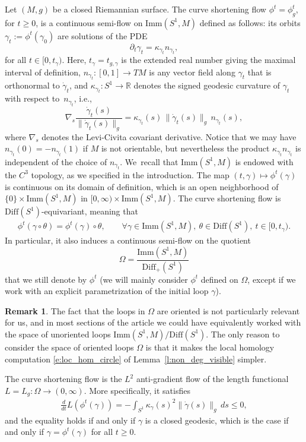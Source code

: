 \documentclass[11pt]{article}
\newcommand{\ie}{i.e.,\xspace}
\newcommand{\R}{\mathbb{R}}
\newcommand{\Diff}{\mathrm{Diff}}
\newcommand{\Imm}{\mathrm{Imm}}
\theoremstyle{plain}
\theoremstyle{definition}
\newtheorem{Remark}[Thm]{Remark}
\begin{document}
Let $(M,g)$ be a closed Riemannian surface.
The curve shortening flow $\phi^t=\phi^t_g$, for $t\geq0$, is a continuous semi-flow on $\Imm(S^1,M)$ defined as follows: its orbits $\gamma_t:=\phi^t(\gamma_0)$ are solutions of the PDE
\[
\partial_t\gamma_t=\kappa_{\gamma_t}n_{\gamma_t},
\]
for all $t\in[0,t_\gamma)$. Here, $t_\gamma=t_{g,\gamma}$ is the extended real number giving the maximal interval of definition, $n_{\gamma_t}:[0,1]\to TM$ is any vector field along $\gamma_t$ that is orthonormal to $\dot\gamma_t$, and $\kappa_{\gamma_t}:S^1\to\R$ denotes the signed geodesic curvature of $\gamma_t$ with respect to~$n_{\gamma_t}$, \ie
\[
\nabla\!_s\frac{\dot\gamma_t(s)}{\|\dot\gamma_t(s)\|_g}
=
\kappa_{\gamma_t}(s)\,\|\dot\gamma_t(s)\|_g\,n_{\gamma_t}(s),
\]
where $\nabla_s$ denotes the Levi-Civita covariant derivative. Notice that we may have $n_{\gamma_t}(0)=-n_{\gamma_t}(1)$ if $M$ is not orientable, but nevertheless the product $\kappa_{\gamma_t} n_{\gamma_t}$ is independent of the choice of $n_{\gamma_t}$. We~recall that $\Imm(S^1,M)$ is endowed with the $C^3$ topology, as we specified in the introduction.
The map $(t,\gamma)\mapsto\phi^t(\gamma)$ is continuous on its domain of definition, which is an open neighborhood of $\{0\}\times\Imm(S^1,M)$ in $[0,\infty)\times\Imm(S^1,M)$.
The curve shortening flow is $\Diff(S^1)$-equivariant, meaning that
\begin{align*}
\phi^t(\gamma\circ\theta)
=
\phi^t(\gamma)\circ\theta,
\qquad\forall\gamma\in\Imm(S^1,M),\ \theta\in\Diff(S^1),\ t\in[0,t_\gamma).
\end{align*}
In particular, it also induces a continuous semi-flow on the quotient
\[
\Omega=\frac{\Imm(S^1,M)}{\Diff_+(S^1)}
\] that we still denote by $\phi^t$ (we will mainly consider $\phi^t$ defined on $\Omega$, except if we work with an explicit parametrization of the initial loop $\gamma$).

\begin{Remark}
The fact that the loops in $\Omega$ are oriented is not particularly relevant for us, and in most sections of the article we could have equivalently worked with the space of unoriented loops $\Imm(S^1,M)/\Diff(S^1)$. The only reason to consider the space of oriented loops $\Omega$ is that it makes the local homology computation \eqref{e:loc_hom_circle} of Lemma~\ref{l:non_deg_visible} simpler.
\end{Remark}

The curve shortening flow is the $L^2$ anti-gradient flow of the length functional $L=L_g:\Omega\to(0,\infty)$. More specifically, it satisfies
\begin{align}
\label{e:derivative_length}
\frac{d}{dt} L(\phi^t(\gamma))
=
-\int_{S^1} \kappa_\gamma(s)^2 \|\dot\gamma(s)\|_g\,ds
\leq0,
\end{align}
and the equality holds if and only if $\gamma$ is a closed geodesic, which is the case if and only if $\gamma=\phi^t(\gamma)$ for all $t\geq0$.
\end{document}
